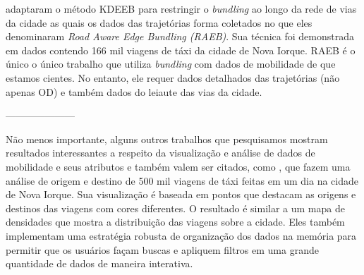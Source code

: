 \citet{zeng:19} adaptaram o método KDEEB para restringir o \emph{bundling}
ao longo da rede de vias da cidade as quais os dados das trajetórias forma
coletados no que eles denominaram \emph{Road Aware Edge
Bundling (RAEB)}. Sua técnica foi demonstrada em dados contendo
166 mil viagens de táxi da cidade de Nova Iorque. RAEB é o único o único
trabalho que utiliza \emph{bundling} com dados de mobilidade de que estamos cientes.
No entanto, ele requer dados detalhados das trajetórias (não apenas OD) e também
dados do leiaute das vias da cidade.





---------------------

Não menos importante, alguns outros trabalhos que pesquisamos mostram resultados
interessantes a respeito da visualização e análise de dados de mobilidade e seus
atributos e também valem ser citados, como \citet{Ferreira2013}, que fazem uma
análise de origem e destino de 500 mil viagens de táxi feitas em um dia na
cidade de Nova Iorque. Sua visualização é baseada em pontos que destacam as
origens e destinos das viagens com cores diferentes. O resultado é similar a um
mapa de densidades que mostra a distribuição das viagens sobre a cidade. Eles
também implementam uma estratégia robusta de organização dos dados na memória
para permitir que os usuários façam buscas e apliquem filtros em uma grande
quantidade de dados de maneira interativa.

